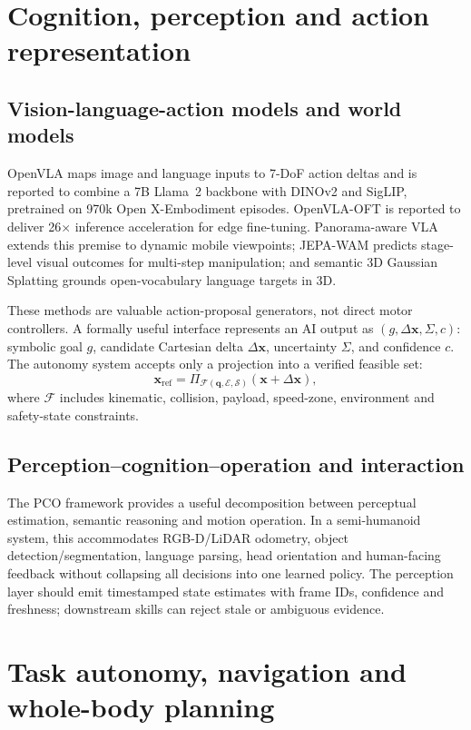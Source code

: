 \documentclass[10pt,a4paper]{article}
\begin{document}
\section{Cognition, perception and action representation}
\subsection{Vision-language-action models and world models}
OpenVLA maps image and language inputs to 7-DoF action deltas and is reported to combine a 7B Llama~2 backbone with DINOv2 and SigLIP, pretrained on 970k Open X-Embodiment episodes. OpenVLA-OFT is reported to deliver 26$\times$ inference acceleration for edge fine-tuning.\cite{openvla,oft} Panorama-aware VLA extends this premise to dynamic mobile viewpoints; JEPA-WAM predicts stage-level visual outcomes for multi-step manipulation; and semantic 3D Gaussian Splatting grounds open-vocabulary language targets in 3D.\cite{pano,jepa,gaussian}

These methods are valuable action-proposal generators, not direct motor controllers. A formally useful interface represents an AI output as $(g,\Delta\mathbf{x},\Sigma,c)$: symbolic goal $g$, candidate Cartesian delta $\Delta\mathbf{x}$, uncertainty $\Sigma$, and confidence $c$. The autonomy system accepts only a projection into a verified feasible set:
\begin{equation}
\mathbf{x}_{\mathrm{ref}}=\Pi_{\mathcal{F}(\mathbf{q},\mathcal{E},\mathcal{S})}\!\left(\mathbf{x}+\Delta\mathbf{x}\right),
\end{equation}
where $\mathcal{F}$ includes kinematic, collision, payload, speed-zone, environment and safety-state constraints.

\subsection{Perception--cognition--operation and interaction}
The PCO framework provides a useful decomposition between perceptual estimation, semantic reasoning and motion operation.\cite{pco} In a semi-humanoid system, this accommodates RGB-D/LiDAR odometry, object detection/segmentation, language parsing, head orientation and human-facing feedback without collapsing all decisions into one learned policy. The perception layer should emit timestamped state estimates with frame IDs, confidence and freshness; downstream skills can reject stale or ambiguous evidence.

\section{Task autonomy, navigation and whole-body planning}
\end{document}
